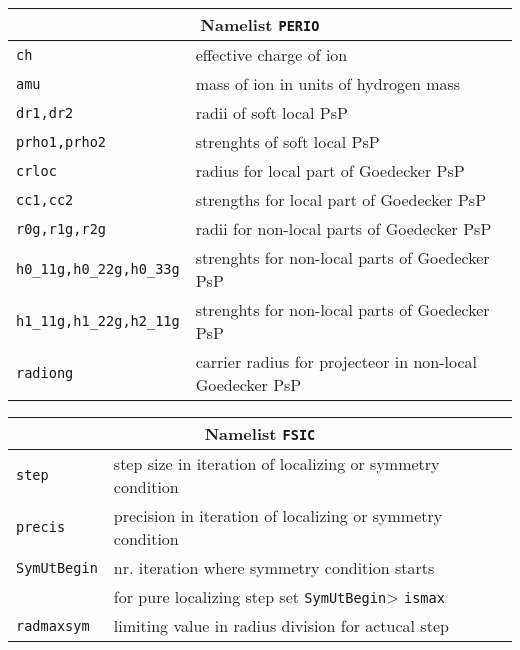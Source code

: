 \documentclass[12pt]{article}
\begin{document}
\begin{enumerate}
\begin{tabular}{ll}
\hline
\multicolumn{2}{c}{Namelist {\tt PERIO}} in {\tt for005.<name>} \\
\hline
{\tt ch}& effective charge of ion \\
{\tt amu}& mass of ion in units of hydrogen mass\\
{\tt dr1,dr2}& radii of soft local PsP\\
{\tt prho1,prho2}& strenghts of soft local PsP\\
{\tt crloc}& radius for local part of Goedecker PsP\\
{\tt cc1,cc2}& strengths for local part of  Goedecker PsP\\
{\tt r0g,r1g,r2g}& radii for non-local parts of  Goedecker PsP\\
{\tt h0\_11g,h0\_22g,h0\_33g}& 
  strenghts for non-local parts of  Goedecker PsP\\
{\tt h1\_11g,h1\_22g,h2\_11g}&
  strenghts for non-local parts of  Goedecker PsP\\
{\tt radiong}& carrier radius for projecteor in non-local Goedecker PsP\\
\hline
\end{tabular}


\begin{tabular}{ll}
\hline
\multicolumn{2}{c}{Namelist {\tt FSIC}} in {\tt for005.<name>} \\
\hline
{\tt step}& step size in iteration of localizing or symmetry condition \\
{\tt precis}& precision in iteration of localizing or symmetry condition \\
{\tt SymUtBegin}& nr. iteration where symmetry condition starts\\
 &               for pure localizing step set {\tt  SymUtBegin}> {\tt ismax}\\
{\tt radmaxsym}& limiting value in radius division  for actucal step\\
\hline
\end{tabular}


\vspace*{2cm}


\end{enumerate}
\end{document}
